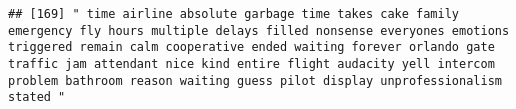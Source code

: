 \documentclass[
]{article}
\begin{document}
\begin{verbatim}
## [169] " time airline absolute garbage time takes cake family emergency fly hours multiple delays filled nonsense everyones emotions triggered remain calm cooperative ended waiting forever orlando gate traffic jam attendant nice kind entire flight audacity yell intercom problem bathroom reason waiting guess pilot display unprofessionalism stated "                                                                                                                                                                                                                                                                                                                                                                                                                                                                                                                                                                                                                                                                                                                                                                                                                                                                                                                                                                                                                                                                                                                                                                                                                                                                                                                                                                                                                                          

\end{verbatim}
\end{document}
